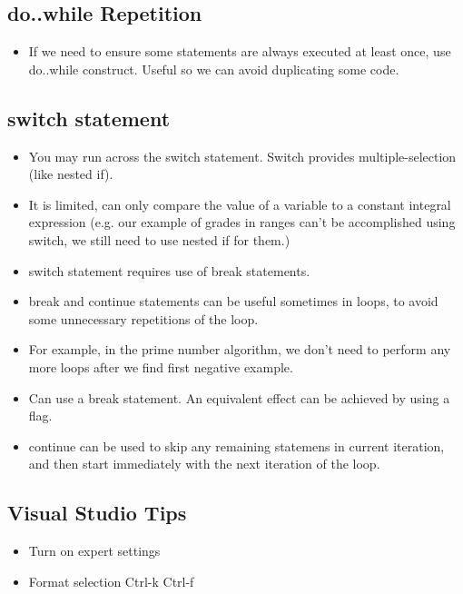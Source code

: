 \documentclass[11pt]{article}
\begin{document}
\subsection{do..while Repetition}
\label{sec-3-2}
\begin{itemize}
\item If we need to ensure some statements are always executed at least
once, use do..while construct.  Useful so we can avoid duplicating
some code.
\end{itemize}
\subsection{switch statement}
\label{sec-3-3}
\begin{itemize}
\item You may run across the switch statement.  Switch provides multiple-selection (like nested if).
\item It is limited, can only compare the value of a variable to a
constant integral expression (e.g. our example of grades in ranges
can't be accomplished using switch, we still need to use nested if
for them.)
\item switch statement requires use of break statements.
\item break and continue statements can be useful sometimes in loops, to
avoid some unnecessary repetitions of the loop.
\item For example, in the prime number algorithm, we don't need to perform
any more loops after we find first negative example.
\item Can use a break statement.  An equivalent effect can be achieved by using a flag.
\item continue can be used to skip any remaining statemens in current
iteration, and then start immediately with the next iteration of the
loop.
\end{itemize}

\subsection{Visual Studio Tips}
\label{sec-3-4}
\begin{itemize}
\item Turn on expert settings
\item Format selection Ctrl-k Ctrl-f
\end{itemize}
\end{document}

